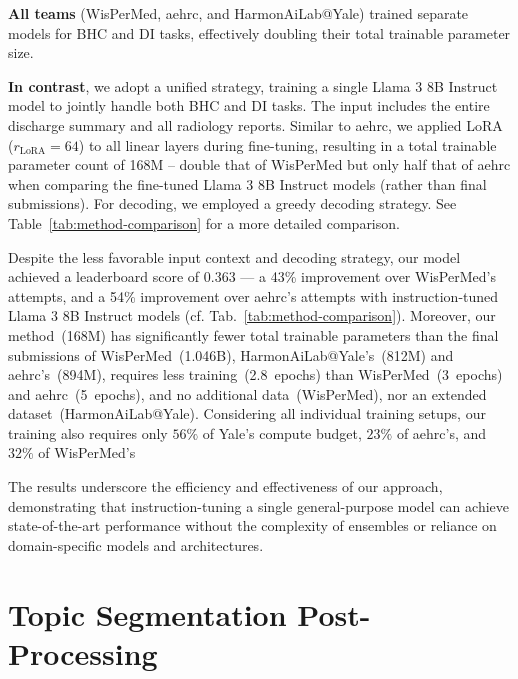 \textbf{All teams} (WisPerMed, aehrc, and HarmonAiLab@Yale) trained separate models for BHC and DI tasks, effectively doubling their total trainable parameter size.

\textbf{In contrast}, we adopt a unified strategy, training a single Llama 3 8B Instruct model to jointly handle both BHC and DI tasks. The input includes the entire discharge summary and all radiology reports. Similar to aehrc, we applied LoRA ($r_{\text{LoRA}} = 64$) to all linear layers during fine-tuning, resulting in a total trainable parameter count of 168M -- double that of WisPerMed but only half that of aehrc when comparing the fine-tuned Llama 3 8B Instruct models (rather than final submissions). For decoding, we employed a greedy decoding strategy. See Table~\ref{tab:method-comparison} for a more detailed comparison.

Despite the less favorable input context and decoding strategy, our model achieved a leaderboard score of $0.363$ --- a 43\% improvement over WisPerMed's attempts, and a 54\% improvement over aehrc's attempts with instruction-tuned Llama 3 8B Instruct models (cf. Tab.~\ref{tab:method-comparison}). Moreover, our method~(168M) has significantly fewer total trainable parameters than the final submissions of WisPerMed~(1.046B), HarmonAiLab@Yale's~(812M) and aehrc's~(894M), requires less training~(2.8~epochs) than WisPerMed~(3~epochs) and aehrc~(5~epochs), and no additional data~(WisPerMed), nor an extended dataset~(HarmonAiLab@Yale). Considering all individual training setups, our training also requires only $56\%$ of Yale’s compute budget, $23\%$ of aehrc’s, and $32\%$ of WisPerMed’s

The results underscore the efficiency and effectiveness of our approach, demonstrating that instruction-tuning a single general-purpose model can achieve state-of-the-art performance without the complexity of ensembles or reliance on domain-specific models and architectures.



\section{Topic Segmentation Post-Processing}
\label{sec:topic-segmentation-post-processing}


